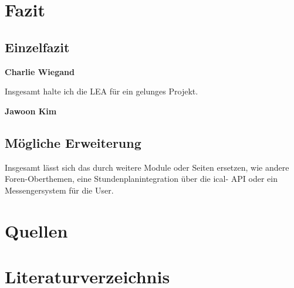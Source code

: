 \documentclass[12pt,titlepage]{article}
\begin{document}
\FloatBarrier

\section{Fazit}

\subsection{Einzelfazit}
\textbf{Charlie Wiegand}

Insgesamt halte ich die LEA für ein gelunges Projekt.


\textbf{Jawoon Kim}

\subsection{Mögliche Erweiterung}

Insgesamt lässt sich das durch weitere Module oder Seiten ersetzen, wie andere Foren-Oberthemen, eine Stundenplanintegration über die ical- API oder 
ein Messengersystem für die User.

\section{Quellen}

\section{Literaturverzeichnis}
\end{document}
